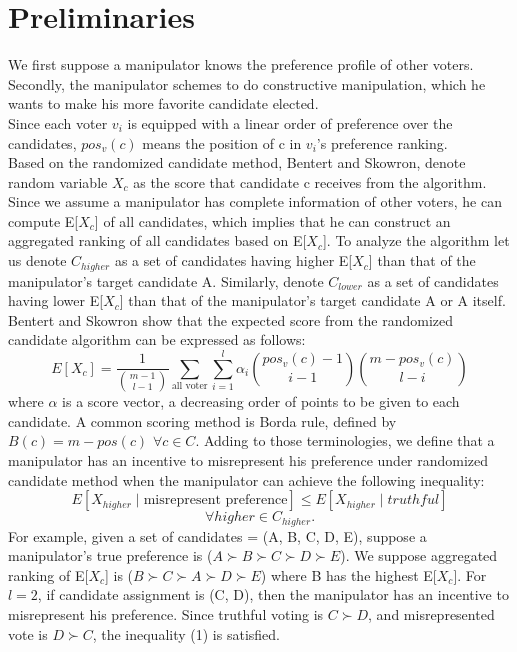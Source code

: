 \documentclass[letterpaper]{article} %
\begin{document}
\section{Preliminaries}
We first suppose a manipulator knows the preference profile of other voters. Secondly, the manipulator schemes to do constructive manipulation, which he wants to make his more favorite candidate elected.\\
Since each voter $v_i$ is equipped with a linear order of preference over the candidates, $pos_v(c)$ means the position of c in $v_i$’s preference ranking.\\
Based on the randomized candidate method, Bentert and Skowron, denote random variable $X_c$ as the score that candidate c receives from the algorithm. Since we assume a manipulator has complete information of other voters, he can compute E[$X_c$] of all candidates, which implies that he can construct an aggregated ranking of all candidates based on E[$X_c$]. To analyze the algorithm let us denote $C_{higher}$ as a set of candidates having higher E[$X_c$] than that of the manipulator’s target candidate A. Similarly, denote $C_{lower}$  as a set of candidates having lower E[$X_c$] than that of the manipulator’s target candidate A or A itself. Bentert and Skowron show that the expected score from the randomized candidate algorithm can be expressed as follows: \\ 
\begin{equation} 
E[X_c] = \frac{1}{\binom{m-1}{l-1}}\sum_{\text{all voter}} \sum_{i=1}^l \alpha_i \binom{pos_v(c)-1}{i-1}\binom{m-pos_v(c)}{l-i} 
\end{equation}
where $\alpha$ is a score vector, a decreasing order of points to be given to each candidate. A common scoring method is Borda rule, defined by $B(c) = m - pos(c)$ $\forall c \in C$. Adding to those terminologies, we define that a manipulator has an incentive to misrepresent his preference under randomized candidate method when the manipulator can achieve the following inequality: 
\begin{equation}
E[X_{higher} \mid \text{misrepresent preference}] \le E[X_{higher} \mid truthful]
\end{equation}
 $$\forall higher \in C_{higher}.$$
For example, given a set of candidates = (A, B, C, D, E), suppose a manipulator’s true preference is ($A\succ B\succ C\succ D\succ E$). We suppose aggregated ranking of E[$X_c$] is ($B\succ C\succ A\succ D\succ E$) where B has the highest E[$X_c$]. For $l=2$, if candidate assignment is (C, D), then the manipulator has an incentive to misrepresent his preference. Since truthful voting is $C\succ D$, and misrepresented vote is $D \succ C$, the inequality (1) is satisfied. 
\end{document}
